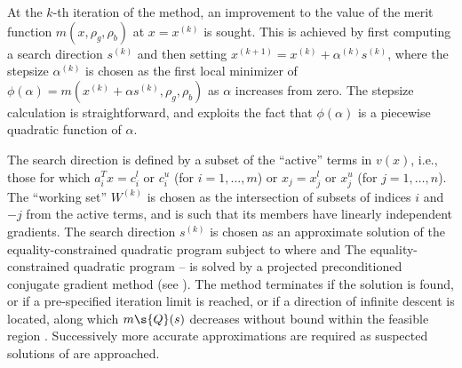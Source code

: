 \documentclass[twoside]{article}
\begin{document}
At the $k$-th iteration of the method, an improvement to the value
of the merit function $m(x, \rho_g, \rho_b )$ 
at $x = x^{(k)}$ is sought. This is achieved by first 
computing a search direction $s^{(k)}$
and then setting $x^{(k+1)} = x^{(k)} + \alpha^{(k)} s^{(k)}$,
where the stepsize $\alpha^{(k)}$ is chosen as the first local minimizer of 
$\phi ( \alpha ) = m( x^{(k)} + \alpha s^{(k)} , \rho_g, \rho_b )$
as $\alpha$ increases from zero. 
The stepsize calculation is straightforward, and exploits the fact that
$\phi ( \alpha )$ is a piecewise quadratic function of $\alpha$.

The search direction is defined by a subset of the ``active'' terms in 
$v(x)$, i.e., those for which 
$a_i^T x = c_i^l$ or $c_i^u$ (for $i=1,\ldots ,m$) or 
$x_j = x_j^l$ or $x_j^u$ (for $j=1,\ldots ,n$).
The ``working set'' $W^{(k)}$ is chosen as the intersection of 
subsets of indices $i$ and $-j$ from the active terms, and is such 
that its members have linearly independent gradients. 
The search direction $s^{(k)}$ is chosen as an approximate solution of 
the equality-constrained quadratic program
subject to 
where
and
The equality-constrained quadratic program -- is solved by
a projected preconditioned conjugate gradient 
method (see ). The method terminates
if the solution is found, or if a pre-specified iteration limit is reached,
or if a direction of infinite descent is located, along which $m\s{Q}(s)$
decreases without bound within the feasible region .
Successively more accurate approximations are required as suspected 
solutions of  are approached.
\end{document}
